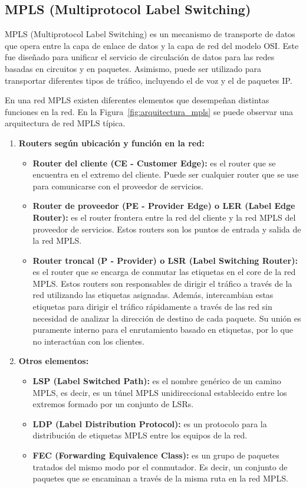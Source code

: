 \subsection{MPLS (Multiprotocol Label Switching)}
\label{subsec:mpls}
MPLS (Multiprotocol Label Switching) \cite{wikipedia_mpls} es un mecanismo de transporte de datos que opera entre la capa de enlace de datos y la capa de red del modelo OSI. Este fue diseñado para unificar el servicio de circulación de datos para las redes basadas en circuitos y en paquetes. Asimismo, puede ser utilizado para transportar diferentes tipos de tráfico, incluyendo el de voz y el de paquetes IP.

\vspace{0.5cm}
\noindent
En una red MPLS existen diferentes elementos \cite{mpls_elements} que desempeñan distintas funciones en la red. En la Figura~\ref{fig:arquitectura_mpls} se puede observar una arquitectura de red MPLS típica.
\begin{enumerate}
  \item \textbf{Routers según ubicación y función en la red:}
  \begin{itemize}
    \item \textbf{Router del cliente (CE - Customer Edge):} es el router que se encuentra en el extremo del cliente. Puede ser cualquier router que se use para comunicarse con el proveedor de servicios.
    \item \textbf{Router de proveedor (PE - Provider Edge) o LER (Label Edge Router):} es el router frontera entre la red del cliente y la red MPLS del proveedor de servicios. Estos routers son los puntos de entrada y salida de la red MPLS.
    \item \textbf{Router troncal (P - Provider) o LSR (Label Switching Router):} es el router que se encarga de conmutar las etiquetas en el core de la red MPLS. Estos routers son responsables de dirigir el tráfico a través de la red utilizando las etiquetas asignadas. Además,
    intercambian estas etiquetas para dirigir el tráfico rápidamente a través de las red sin necesidad de analizar la dirección de destino de cada paquete. Su unión es puramente interno para el enrutamiento basado en etiquetas, por lo que no interactúan
    con los clientes.
  \end{itemize}
  \item \textbf{Otros elementos:}
  \begin{itemize}
    \item \textbf{LSP (Label Switched Path):} es el nombre genérico de un camino MPLS, es decir, es un túnel MPLS unidireccional establecido entre los extremos formado por un conjunto de LSRs.
    \item \textbf{LDP (Label Distribution Protocol):} es un protocolo para la distribución de etiquetas MPLS entre los equipos de la red.
    \item \textbf{FEC (Forwarding Equivalence Class):} es un grupo de paquetes tratados del mismo modo por el conmutador. Es decir, un conjunto de paquetes que se encaminan a través de la misma ruta en la red MPLS.
  \end{itemize}
\end{enumerate}

